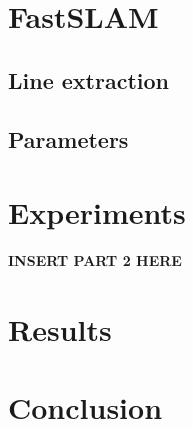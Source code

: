 \documentclass[12pt]{article}
\begin{document}
\section{FastSLAM}
\subsection{Line extraction}
\subsection{Parameters}
\section{Experiments}
\textbf{INSERT PART 2 HERE}
\section{Results}

\section{Conclusion}
\end{document}
